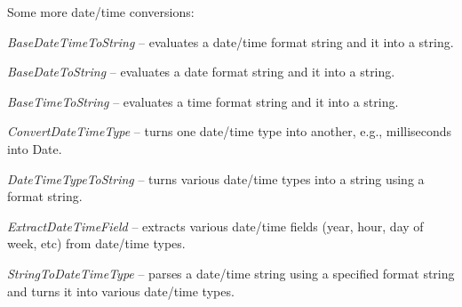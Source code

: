 Some more date/time conversions:
\begin{tight_itemize}
	\item \textit{BaseDateTimeToString} -- evaluates a date/time format string
	and it into a string.
	\item \textit{BaseDateToString} -- evaluates a date format string
	and it into a string.
	\item \textit{BaseTimeToString} -- evaluates a time format string
	and it into a string.
	\item \textit{ConvertDateTimeType} -- turns one date/time type into another,
	e.g., milliseconds into Date.
	\item \textit{DateTimeTypeToString} -- turns various date/time types into a
	string using a format string.
	\item \textit{ExtractDateTimeField} -- extracts various date/time fields
	(year, hour, day of week, etc) from date/time types.
	\item \textit{StringToDateTimeType} -- parses a date/time string using a
	specified format string and turns it into various date/time types.
\end{tight_itemize}

\clearpage
